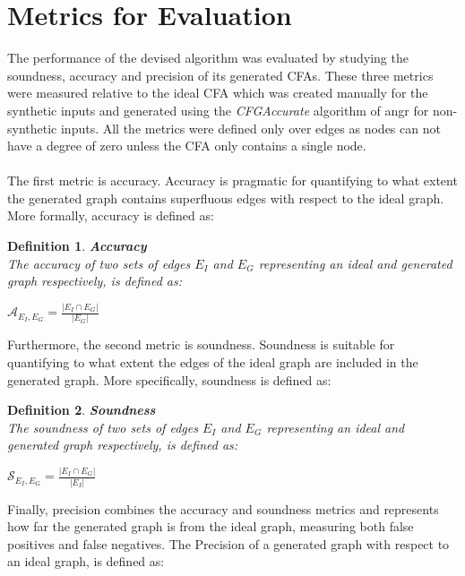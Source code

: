 \documentclass{kththesis}
\newtheorem*{definition}{Definition}
\newcommand{\fbcomment}[1]{{#1}}
\renewcommand{\fbcomment}[1]{}
\renewcommand{\it}[1]{\textit{#1}}
\begin{document}
\section{Metrics for Evaluation}\label{sec:metrics}
\fbcomment{\color{red}Goal: Introduce the metrics that will be used in the result chapter. Was put in the end of the method chapter since it is only relevant for the result chapter(The notions are introduced in the background chapter but not given formal definitions until now).}
The performance of the devised algorithm was evaluated by studying the soundness, accuracy and precision of its generated CFAs. These three metrics were measured relative to the ideal CFA which was created manually for the synthetic inputs and generated using the \it{CFGAccurate} algorithm of angr for non-synthetic inputs. All the metrics were defined only over edges as nodes can not have a degree of zero unless the CFA only contains a single node.
\\ \\
The first metric is accuracy. Accuracy is pragmatic for quantifying to what extent the generated graph contains superfluous edges with respect to the ideal graph. More formally, accuracy is defined as:
\begin{definition} \textbf{Accuracy}\\
The accuracy of two sets of edges $E_I$ and $E_G$ representing an ideal and generated graph respectively, is defined as:
\begin{center}
$\mathcal{A}_{E_I,E_G} = \frac{|E_I \cap E_G|}{|E_G|}$    
\end{center}
\end{definition}
\noindent
Furthermore, the second metric is soundness. Soundness is suitable for quantifying to what extent the edges of the ideal graph are included in the generated graph. More specifically, soundness is defined as:
\begin{definition} \textbf{Soundness}\\
The soundness of two sets of edges $E_I$ and $E_G$ representing an ideal and generated graph respectively, is defined as:
\begin{center}
$\mathcal{S}_{E_I,E_G} = \frac{|E_I \cap E_G|}{|E_I|}$    
\end{center}
\end{definition}
\noindent
Finally, precision combines the accuracy and soundness metrics and represents how far the generated graph is from the ideal graph, measuring both false positives and false negatives. The Precision of a generated graph with respect to an ideal graph, is defined as:
\end{document}
